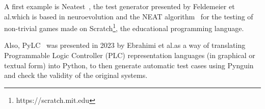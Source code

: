 \documentclass[%
  chapterprefix=false,%
  open=right,%
  twoside=true,%
  paper=a4,%
  logofile={Figures/logo.png},%
  thesistype=master,%
  UKenglish,%
]{se2thesis}
\begin{document}
A first example is Neatest~\cite{DBLP:conf/kbse/Feldmeier022}, the test generator presented by Feldemeier et al.\@ which is based in neuroevolution and the NEAT algorithm~\cite{stanley2002evolving} for the testing of non-trivial games made on Scratch\footnote{https://scratch.mit.edu}, the educational programming language.

Also, PyLC~\cite{DBLP:conf/sac/SalariEAS23} was presented in 2023 by Ebrahimi et al.\@ as a way of translating Programmable Logic Controller (PLC) representation languages (in graphical or textual form) into Python, to then generate automatic test cases using Pynguin and check the validity of the original systems.

\backmatter{}

\printbibliography{}
\end{document}
